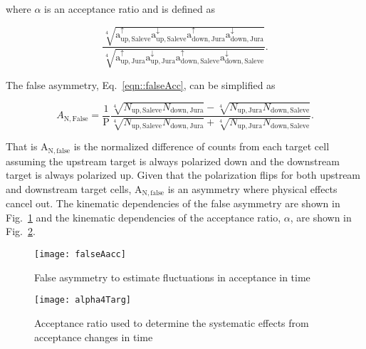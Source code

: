 \noindent
where $\alpha$ is an acceptance ratio and is defined as

\begin{equation}
  \frac{
    \sqrt[4]{
      \mathrm{a}^{\uparrow}_{\mathrm{up,Saleve}}
      \mathrm{a}^{\downarrow}_{\mathrm{up,Saleve}}
      \mathrm{a}^{\uparrow}_{\mathrm{down,Jura}}
      \mathrm{a}^{\downarrow}_{\mathrm{down,Jura}}}
  }{
    \sqrt[4]{
      \mathrm{a}^{\uparrow}_{\mathrm{up,Jura}}
      \mathrm{a}^{\downarrow}_{\mathrm{up,Jura}}
      \mathrm{a}^{\uparrow}_{\mathrm{down,Saleve}}
      \mathrm{a}^{\downarrow}_{\mathrm{down,Saleve}}}
  }.
\end{equation}

\noindent
The false asymmetry, Eq.~\ref{eqn::falseAcc}, can be simplified as

\begin{equation}
  A_{\mathrm{N,False}} = 
  \frac{1}{\mathrm{P}}
  \frac{
    \sqrt[4]{
      N_{\mathrm{up, Saleve}}
      N_{\mathrm{down, Jura}}
    } -
    \sqrt[4]{
      N_{\mathrm{up, Jura}}
      N_{\mathrm{down, Saleve}}
    }
  }{
    \sqrt[4]{
      N_{\mathrm{up, Saleve}}
      N_{\mathrm{down, Jura}}
    } +
    \sqrt[4]{
      N_{\mathrm{up, Jura}}
      N_{\mathrm{down, Saleve}}
    }
  }.
\end{equation}

\noindent
That is A$_{\mathrm{N,false}}$ is the normalized difference of counts from each
target cell assuming the upstream target is always polarized down and the
downstream target is always polarized up.  Given that the polarization flips for
both upstream and downstream target cells, A$_{\mathrm{N,false}}$ is an
asymmetry where physical effects cancel out.  The kinematic dependencies of the
false asymmetry are shown in Fig.~\ref{fig::falseAacc} and the kinematic
dependencies of the acceptance ratio, $\alpha$, are shown in
Fig.~\ref{fig::alpha}.

\begin{figure}[h!t]
  \begin{center}
    \texttt{[image: falseAacc]}
    \caption{False asymmetry to estimate fluctuations in acceptance in time}
    \label{fig::falseAacc}
  \end{center}
\end{figure}

\begin{figure}[h!t]
  \begin{center}
    \texttt{[image: alpha4Targ]}
    \caption{Acceptance ratio used to determine the systematic effects from
      acceptance changes in time}
    \label{fig::alpha}
  \end{center}
\end{figure}

